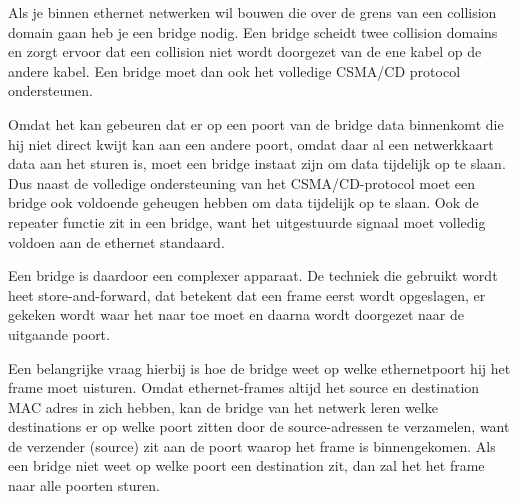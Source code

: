 Als je binnen ethernet netwerken wil bouwen die over de grens van een collision domain gaan heb je een bridge nodig. Een bridge scheidt twee collision domains en zorgt ervoor dat een collision niet wordt doorgezet van de ene kabel op de andere kabel. Een bridge moet dan ook het volledige CSMA/CD protocol ondersteunen.

Omdat het kan gebeuren dat er op een poort van de bridge data binnenkomt die hij niet direct kwijt kan aan een andere poort, omdat daar al een netwerkkaart data aan het sturen is, moet een bridge instaat zijn om data tijdelijk op te slaan. Dus naast de volledige ondersteuning van het CSMA/CD-protocol moet een bridge ook voldoende geheugen hebben om data tijdelijk op te slaan. Ook de repeater functie zit in een bridge, want het uitgestuurde signaal moet volledig voldoen aan de ethernet standaard.

Een bridge is daardoor een complexer apparaat. De techniek die gebruikt wordt heet store-and-forward, dat betekent dat een frame eerst wordt opgeslagen, er gekeken wordt waar het naar toe moet en daarna wordt doorgezet naar de uitgaande poort.

Een belangrijke vraag hierbij is hoe de bridge weet op welke ethernetpoort hij het frame moet uisturen. Omdat ethernet-frames altijd het source en destination MAC adres in zich hebben, kan de bridge van het netwerk leren welke destinations er op welke poort zitten door de source-adressen te verzamelen, want de verzender (source) zit aan de poort waarop het frame is binnengekomen. Als een bridge niet weet op welke poort een destination zit, dan zal het het frame naar alle poorten sturen.

